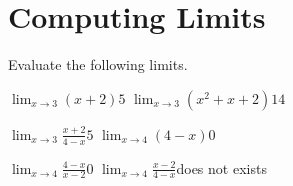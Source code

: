 \section{Computing Limits}
Evaluate the following limits.

\pairofprobsans%
{$\displaystyle \lim_{x\rightarrow3} \left(x + 2\right)$}{$5$}
{$\displaystyle \lim_{x\rightarrow3} \left(x^2 + x + 2\right)$}{$14$}

\pairofprobsans%
{$\displaystyle \lim_{x\rightarrow3} \frac{x + 2}{4 - x}$}{$5$}
{$\displaystyle \lim_{x\rightarrow4} {\left(4 - x\right)}$}{$0$}

\pairofprobsans%
{$\displaystyle \lim_{x\rightarrow4} \frac{4 - x}{x - 2}$}{$0$}
{$\displaystyle \lim_{x\rightarrow4} \frac{x - 2}{4 - x}$}{does not exists}


